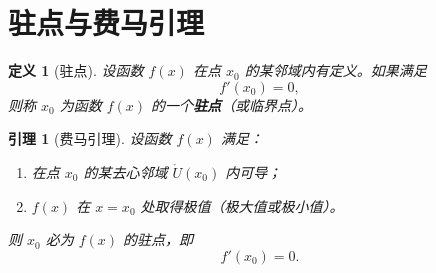 \documentclass[UTF8]{ctexart} %
\newtheorem{definition}{定义}[section] %
\newtheorem{theorem}{引理}[section]    %
\begin{document}
\section{驻点与费马引理}

\begin{definition}[驻点]
设函数 \( f(x) \) 在点 \( x_0 \) 的某邻域内有定义。如果满足
\[
f'(x_0) = 0,
\]
则称 \( x_0 \) 为函数 \( f(x) \) 的一个\textbf{驻点}（或临界点）。
\end{definition}

\begin{theorem}[费马引理]
设函数 \( f(x) \) 满足：
\begin{enumerate}
    \item 在点 \( x_0 \) 的某去心邻域 \( \mathring{U}(x_0) \) 内可导；
    \item \( f(x) \) 在 \( x = x_0 \) 处取得极值（极大值或极小值）。
\end{enumerate}
则 \( x_0 \) 必为 \( f(x) \) 的驻点，即
\[
f'(x_0) = 0.
\]
\end{theorem}
\end{document}
